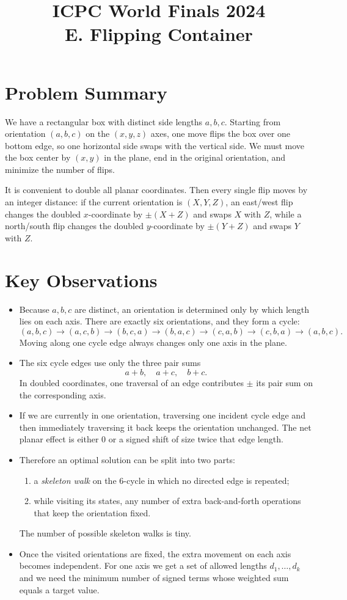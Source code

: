 \documentclass[11pt]{article}
\title{ICPC World Finals 2024\\E. Flipping Container}
\author{}
\date{}
\begin{document}
\maketitle

\section*{Problem Summary}

We have a rectangular box with distinct side lengths $a,b,c$. Starting from orientation $(a,b,c)$ on the $(x,y,z)$ axes, one move flips the box over one bottom edge, so one horizontal side swaps with the vertical side. We must move the box center by $(x,y)$ in the plane, end in the original orientation, and minimize the number of flips.

It is convenient to double all planar coordinates. Then every single flip moves by an integer distance: if the current orientation is $(X,Y,Z)$, an east/west flip changes the doubled $x$-coordinate by $\pm (X+Z)$ and swaps $X$ with $Z$, while a north/south flip changes the doubled $y$-coordinate by $\pm (Y+Z)$ and swaps $Y$ with $Z$.

\section*{Key Observations}

\begin{itemize}[leftmargin=*]
    \item Because $a,b,c$ are distinct, an orientation is determined only by which length lies on each axis. There are exactly six orientations, and they form a cycle:
    \[
    (a,b,c)\to(a,c,b)\to(b,c,a)\to(b,a,c)\to(c,a,b)\to(c,b,a)\to(a,b,c).
    \]
    Moving along one cycle edge always changes only one axis in the plane.
    \item The six cycle edges use only the three pair sums
    \[
    a+b,\quad a+c,\quad b+c.
    \]
    In doubled coordinates, one traversal of an edge contributes $\pm$ its pair sum on the corresponding axis.
    \item If we are currently in one orientation, traversing one incident cycle edge and then immediately traversing it back keeps the orientation unchanged. The net planar effect is either $0$ or a signed shift of size twice that edge length.
    \item Therefore an optimal solution can be split into two parts:
    \begin{enumerate}[leftmargin=*]
        \item a \emph{skeleton walk} on the 6-cycle in which no directed edge is repeated;
        \item while visiting its states, any number of extra back-and-forth operations that keep the orientation fixed.
    \end{enumerate}
    The number of possible skeleton walks is tiny.
    \item Once the visited orientations are fixed, the extra movement on each axis becomes independent. For one axis we get a set of allowed lengths $d_1,\dots,d_k$ and we need the minimum number of signed terms whose weighted sum equals a target value.
\end{itemize}
\end{document}
